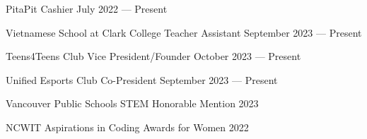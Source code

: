 PitaPit Cashier	\hfill July 2022 --- Present
 
Vietnamese School at Clark College Teacher Assistant	\hfill September 2023 --- Present

Teens4Teens Club Vice President/Founder	\hfill October 2023 --- Present

Unified Esports Club Co-President	\hfill September 2023 --- Present

Vancouver Public Schools STEM Honorable Mention	\hfill 2023

NCWIT Aspirations in Coding Awards for Women	\hfill 2022


